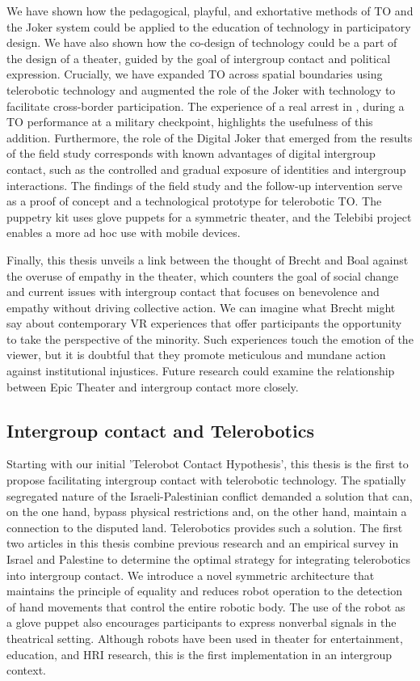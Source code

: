 \documentclass[dissertation,math,vertlayout,pdfa,colorlinks]{aaltoseries}
\begin{document}
We have shown how the pedagogical, playful, and exhortative methods of TO and the Joker system could be applied to the education of technology in participatory design. We have also shown how the co-design of technology could be a part of the design of a theater, guided by the goal of intergroup contact and political expression. Crucially, we have expanded TO across spatial boundaries using telerobotic technology and augmented the role of the Joker with technology to facilitate cross-border participation. The experience of a real arrest in \cite{alonCHAPTERFOURTEENNonViolent2011}, during a TO performance at a military checkpoint, highlights the usefulness of this addition. Furthermore, the role of the Digital Joker that emerged from the results of the field study corresponds with known advantages of digital intergroup contact, such as the controlled and gradual exposure of identities and intergroup interactions. The findings of the field study and the follow-up intervention serve as a proof of concept and a technological prototype for telerobotic TO. The puppetry kit uses glove puppets for a symmetric theater, and the Telebibi project enables a more ad hoc use with mobile devices. 

Finally, this thesis unveils a link between the thought of Brecht and Boal against the overuse of empathy in the theater, which counters the goal of social change and current issues with intergroup contact that focuses on benevolence and empathy without driving collective action. We can imagine what Brecht might say about contemporary VR experiences that offer participants the opportunity to take the perspective of the minority. Such experiences touch the emotion of the viewer, but it is doubtful that they promote meticulous and mundane action against institutional injustices. Future research could examine the relationship between Epic Theater and intergroup contact more closely.

\subsection{Intergroup contact and Telerobotics}
Starting with our initial 'Telerobot Contact Hypothesis', this thesis is the first to propose facilitating intergroup contact with telerobotic technology. The spatially segregated nature of the Israeli-Palestinian conflict demanded a solution that can, on the one hand, bypass physical restrictions and, on the other hand, maintain a connection to the disputed land. Telerobotics provides such a solution. The first two articles in this thesis combine previous research and an empirical survey in Israel and Palestine to determine the optimal strategy for integrating telerobotics into intergroup contact. We introduce a novel symmetric architecture that maintains the principle of equality and reduces robot operation to the detection of hand movements that control the entire robotic body. The use of the robot as a glove puppet also encourages participants to express nonverbal signals in the theatrical setting. Although robots have been used in theater for entertainment, education, and HRI research, this is the first implementation in an intergroup context. 
\end{document}
